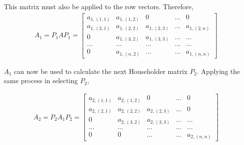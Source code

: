 \documentclass{article}
\begin{document}
		
		
		This matrix must also be applied to the row vectors.  Therefore, 
		\begin{align*}
		A_{1}=P_{1}AP_{1}=
		\begin{bmatrix}
		a_{1,(1,1)} & a_{1,(1,2)} & 0 & ... & 0\\
		a_{1,(2,1)} & a_{1,(2,2)} & a_{1,(2,3)} & ... & a_{1,(2,n)} \\
		0 & a_{1,(3,2)} & a_{1,(3,3)} & ... & ... \\
		... & ... & ... & ... & ...\\
		0 & a_{1,(n,2)} & ... & ... & a_{1,(n,n)}
		\end{bmatrix}
		\end{align*}
		
		$A_{1}$ can now be used to calculate the next Householder matrix $P_{2}$.  Applying the same process in selecting $P_{2}$,

		\begin{align*}
		A_{2}=P_{2}A_{1}P_{2}=
		\begin{bmatrix}
		a_{2,(1,1)} & a_{2,(1,2)} & 0 & ... & 0\\
		a_{2,(2,1)} & a_{2,(2,2)} & a_{2,(2,3)} & ... & 0 \\
		0 & a_{2,(3,2)} & a_{2,(3,3)} & ... & ... \\
		... & ... & ... & ... & ...\\
		0 & 0 & ... & ... & a_{2,(n,n)}
		\end{bmatrix}
		\end{align*}
		
\end{document}
